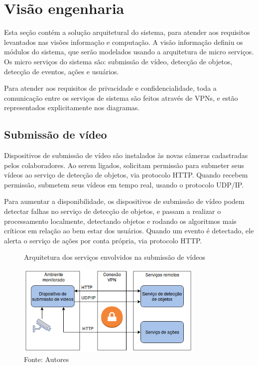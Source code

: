 \documentclass[]{politex}
\begin{document}
\section{Visão engenharia}
Esta seção contém a solução arquitetural do sistema, para atender aos requisitos levantados nas visões informação e computação. A visão informação definiu os módulos do sistema, que serão modelados usando a arquitetura de micro serviços. Os micro serviços do sistema são: submissão de vídeo, detecção de objetos, detecção de eventos, ações e usuários.

Para atender aos requisitos de privacidade e confidencialidade, toda a comunicação entre os serviços de sistema são feitos através de VPNs, e estão representados explicitamente nos diagramas.

\subsection{Submissão de vídeo}
Dispositivos de submissão de vídeo são instalados às novas câmeras cadastradas pelos colaboradores. Ao serem ligados, solicitam permissão para submeter seus vídeos ao serviço de detecção de objetos, via protocolo HTTP. Quando recebem permissão, submetem seus vídeos em tempo real, usando o protocolo UDP/IP. 

Para aumentar a disponibilidade, os dispositivos de submissão de vídeo podem detectar falhas no serviço de detecção de objetos, e passam a realizar o processamento localmente, detectando objetos e rodando os algoritmos mais críticos em relação ao bem estar dos usuários. Quando um evento é detectado, ele alerta o serviço de ações por conta própria, via protocolo HTTP.

\begin{figure}[H]
    \centering
    \caption{Arquitetura dos serviços envolvidos na submissão de vídeos}
    \includegraphics[width=0.8\textwidth]{arquitetura_sub_videos}
    \caption*{Fonte: Autores}
    \label{fig:arquitetura_video}
\end{figure}
\end{document}
